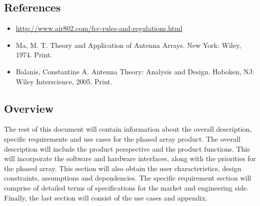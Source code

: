 \documentclass[ProductRequirements.tex]{subfiles}
\begin{document}
	\subsection{References}
		\begin{itemize}
			\item \url{http://www.air802.com/fcc-rules-and-regulations.html}
			\item Ma, M. T. Theory and Application of Antenna Arrays. New York: Wiley, 1974. Print.
			\item Balanis, Constantine A. Antenna Theory: Analysis and Design. Hoboken, NJ: Wiley Interscience, 2005. Print.
		\end{itemize}
	\subsection{Overview}
		The rest of this document will contain information about the overall description, specific requirements and use cases for the phased array product. The overall description will include the product perspective and the product functions. This will incorporate the software and hardware interfaces, along with the priorities for the phased array. This section will also obtain the user characteristics, design constraints, assumptions and dependencies. The specific requirement section will comprise of detailed terms of specifications for the market and engineering side. Finally, the last section will consist of the use cases and appendix.  
\end{document}
